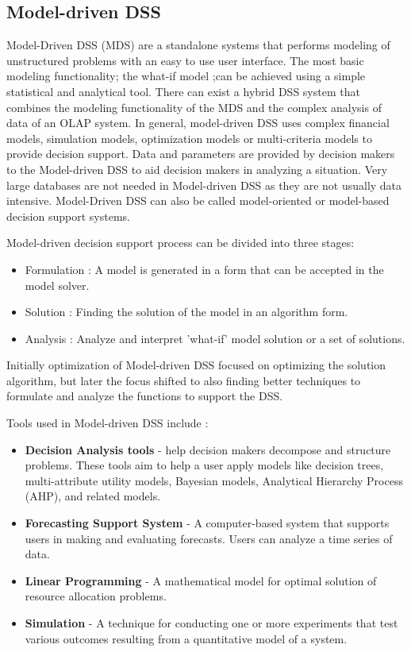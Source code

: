 \subsection{Model-driven DSS}
\label{subsec:ModelDrivenDSS}
Model-Driven DSS (MDS) are a standalone systems that performs modeling of unstructured problems with an easy to use user interface. The most basic modeling functionality; the what-if model ;can be achieved using a simple statistical and analytical tool. There can exist a hybrid DSS system that combines the modeling functionality of the MDS and the complex analysis of data of an OLAP system.\cite{DDSTypes} In general, model-driven DSS uses complex financial models, simulation models, optimization models or multi-criteria models to provide decision support.\cite{DDSTypes} Data and parameters are provided by decision makers to the Model-driven DSS to aid decision makers in analyzing a situation. Very large databases are not needed in Model-driven DSS as they are not usually data intensive.\cite{DDSTypes} Model-Driven DSS can also be called model-oriented or model-based decision support systems.

Model-driven decision support process can be divided into three stages: 
\begin{itemize}
	\item Formulation : A model is generated in a form that can be accepted in the model solver.\cite{shim2002past}
	\item Solution : Finding the solution of the model in an algorithm form.\cite{shim2002past}
	\item Analysis : Analyze and interpret 'what-if' model solution or a set of solutions.\cite{shim2002past}
\end{itemize}

Initially optimization of Model-driven DSS focused on optimizing the solution algorithm, but later the focus shifted to also finding better techniques to formulate and analyze the functions to support the DSS.\cite{shim2002past}

Tools used in Model-driven DSS include \cite{makowski2003modeling}:
\begin{itemize}
	\item \textbf{Decision Analysis tools} - help decision makers decompose and structure problems. These tools aim to help a user apply models like decision trees, multi-attribute utility models, Bayesian models, Analytical Hierarchy Process (AHP), and related models.\cite{DDSTypes}
	\item \textbf{Forecasting Support System} - A computer-based system that supports users in making and evaluating forecasts. Users can analyze a time series of data.\cite{DDSTypes}
	\item \textbf{Linear Programming} - A mathematical model for optimal solution of resource allocation problems.\cite{DDSTypes}
	\item \textbf{Simulation} - A technique for conducting one or more experiments that test various outcomes resulting from a quantitative model of a system.\cite{DDSTypes}
\end{itemize}
